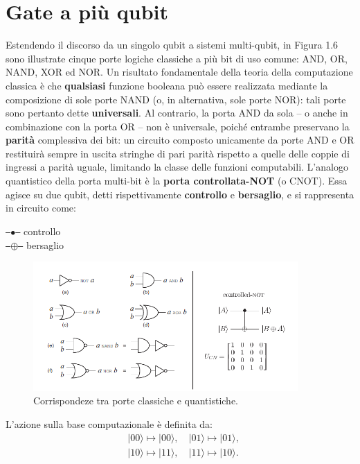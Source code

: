 \documentclass[a4paper,12pt]{report}
\theoremstyle{plain}
\begin{document}
\section{Gate a più qubit}
Estendendo il discorso da un singolo qubit a sistemi multi-qubit, in Figura 1.6 sono illustrate cinque porte logiche classiche a più bit di uso comune: AND, OR, NAND, XOR ed NOR. Un risultato fondamentale della teoria della computazione classica è che \textbf{qualsiasi} funzione booleana può essere realizzata mediante la composizione di sole porte NAND (o, in alternativa, sole porte NOR): tali porte sono pertanto dette \textbf{universali}. Al contrario, la porta AND da sola -- o anche in combinazione con la porta OR -- non è universale, poiché entrambe preservano la \textbf{parità} complessiva dei bit: un circuito composto unicamente da porte AND e OR restituirà sempre in uscita stringhe di pari parità rispetto a quelle delle coppie di ingressi a parità uguale, limitando la classe delle funzioni computabili.
L'analogo quantistico della porta multi-bit è la \textbf{porta controllata-NOT} (o CNOT). Essa agisce su due qubit, detti rispettivamente \textbf{controllo} e \textbf{bersaglio}, e si rappresenta in circuito come:
\begin{center}
    \texttt{---$\bullet$---} \quad controllo \\
    \texttt{---$\oplus$---} \quad bersaglio
\end{center}
\begin{figure}[H]
    \centering
    \includegraphics[width=0.9\textwidth]{Immagine5.png} 
    \caption{Corrispondeze tra porte classiche e quantistiche.}
    \label{Immagine5}
\end{figure}
L'azione sulla base computazionale è definita da:
\begin{equation}
\begin{aligned}
    &|00\rangle \mapsto |00\rangle, \quad |01\rangle \mapsto |01\rangle, \\
    &|10\rangle \mapsto |11\rangle, \quad |11\rangle \mapsto |10\rangle.
\end{aligned}
\end{equation}
\end{document}
